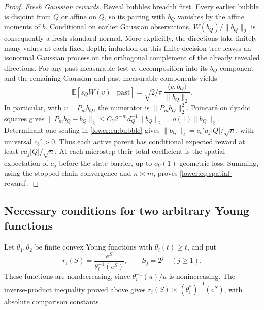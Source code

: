 \documentclass[11pt]{article}
\newcommand{\E}{\mathbb E}
\newcommand{\norm}[1]{\lVert#1\rVert}
\numberwithin{equation}{section}
\begin{document}
\begin{proof}
\emph{Fresh Gaussian rewards.}
Reveal bubbles breadth first.  Every earlier bubble is disjoint from
\(Q\) or affine on \(Q\), so its pairing with \(b_Q\) vanishes by
the affine moments of \(b\).  Conditional on earlier Gaussian
observations, \(W(b_Q)/\norm{b_Q}_2\) is consequently a fresh standard
normal.  More explicitly, the directions take finitely many values at
each fixed depth; induction on this finite decision tree leaves an
isonormal Gaussian process on the orthogonal complement of the already
revealed directions.  For any past-measurable test \(v\), decomposition
into its \(b_Q\) component and the remaining Gaussian and past-measurable
components yields
\[
 \E[s_QW(v)\mid\text{past}]
 =\sqrt{2/\pi}\,\frac{\langle v,b_Q\rangle}{\norm{b_Q}_2}.
\]
In particular, with \(v=P_mb_Q\), the numerator is
\(\norm{P_mb_Q}_2^2\).  Poincar\'e on dyadic squares gives
\(\norm{P_mb_Q-b_Q}_2\le C_V2^{-m}d_Q^{-1}\norm{b_Q}_2=o(1)\norm{b_Q}_2\).
Determinant-one scaling in \eqref{lower:eq:bubble} gives
\(\norm{b_Q}_2=c_b' a_j|Q|/\sqrt n\), with universal \(c_b'>0\).
Thus each active parent has conditional expected reward at least
\(c a_j|Q|/\sqrt n\).  At each microstep their total coefficient is
the spatial expectation of \(a_j\) before the state barrier, up to
\(o_V(1)\) geometric loss.  Summing, using the stopped-chain convergence
and \(n\asymp m\), proves \eqref{lower:eq:spatial-reward}.
\end{proof}




\subsection{Necessary conditions for two arbitrary Young functions}

Let \(\theta_1,\theta_2\) be finite convex Young functions with
\(\theta_i(t)\ge t\), and put
\[
 r_i(S)=\frac{e^S}{\theta_i^{-1}(e^S)},\qquad S_j=2^j\quad(j\ge1).
 \tag{P1}\label{pair:eq:profiles}
\]
These functions are nondecreasing, since
\(\theta_i^{-1}(u)/u\) is nonincreasing.  The inverse-product inequality
proved above gives \(r_i(S)\asymp(\theta_i^*)^{-1}(e^S)\), with
absolute comparison constants.
\end{document}
